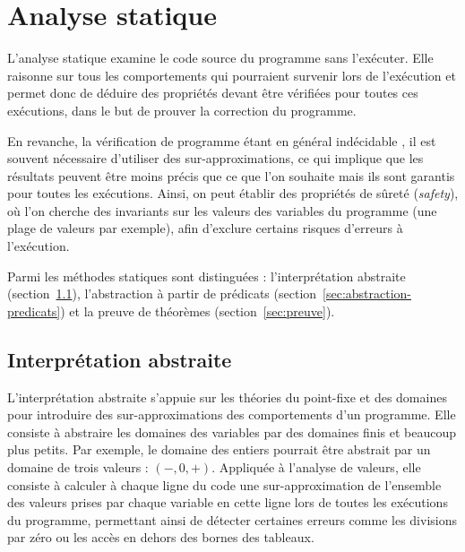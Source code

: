 \documentclass[french]{spimufcphdthesis}
\begin{document}


\section{Analyse statique}
\label{sec:AS}


L'analyse statique \cite{static-analysis} examine le code source du programme
sans l'exécuter. Elle raisonne sur tous les comportements qui pourraient
survenir lors de l'exécution et permet donc de déduire des propriétés devant
être vérifiées pour toutes ces exécutions, dans le but de prouver la correction
du programme.

En revanche, la vérification de programme étant en général indécidable
\cite{undecidability}, il est souvent nécessaire d'utiliser des
sur-approximations, ce qui implique que les résultats peuvent être moins précis
que ce que l'on souhaite mais ils sont garantis pour toutes les exécutions.
Ainsi, on peut établir des propriétés de sûreté ({\em safety}), où l’on cherche
des invariants sur les valeurs des variables du programme (une plage de valeurs
par exemple), afin d'exclure certains risques d'erreurs à l'exécution.

Parmi les méthodes statiques sont distinguées : l'interprétation abstraite
(section~\ref{sec:interpretation-abstraite}), l'abstraction à partir de
prédicats (section~\ref{sec:abstraction-predicats}) et la preuve de théorèmes
(section~\ref{sec:preuve}).


\subsection{Interprétation abstraite}
\label{sec:interpretation-abstraite}

L'interprétation abstraite \cite{abstract-interpretation} s'appuie sur les
théories du point-fixe et des domaines pour introduire des sur-approximations
des comportements d'un programme. Elle consiste à abstraire les domaines des
variables par des domaines finis et beaucoup plus petits. Par exemple, le
domaine des entiers pourrait être abstrait par un domaine de trois valeurs :
$(-, 0, +)$. Appliquée à l’analyse de valeurs, elle consiste à calculer à
chaque ligne du code une sur-approximation de l’ensemble des valeurs prises par
chaque variable en cette ligne lors de toutes les exécutions du programme,
permettant ainsi de détecter certaines erreurs comme les divisions par zéro ou
les accès en dehors des bornes des tableaux.
\end{document}
